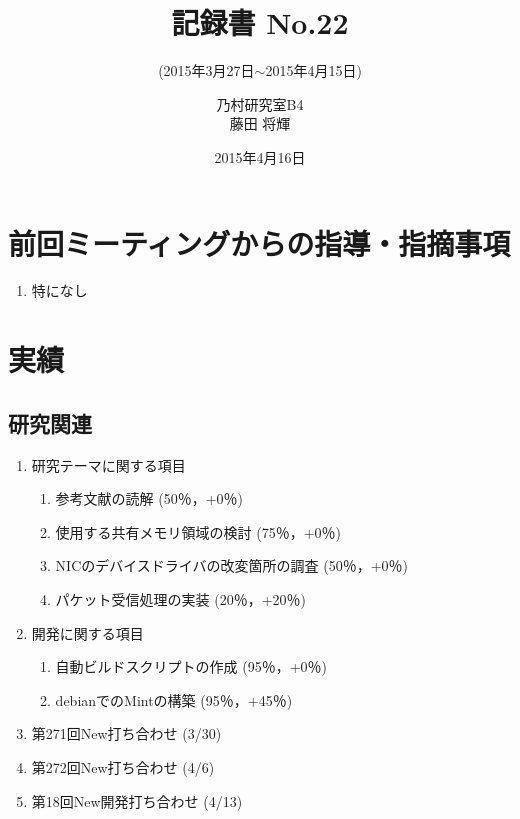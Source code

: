 \documentclass[fleqn, 14pt]{extarticle}
\subtitle{(2015年3月27日$\sim$2015年4月15日)}
\author{乃村研究室B4\\藤田 将輝}
\date{2015年4月16日}
\title{記録書 No.22}
\begin{document}
\maketitle
\section{前回ミーティングからの指導・指摘事項}
\label{sec-1}
\begin{enumerate}
\item 特になし
\newline
\hfill

\end{enumerate}




\section{実績}
\label{sec-2}

\subsection{研究関連}
\label{sec-2-1}
\begin{enumerate}
    \item 研究テーマに関する項目
    \hfill
    \label{enum-research1}
    \begin{enumerate}

        \item 参考文献の読解
        \hfill
        \label{enum-1-A}
        (50％，+0％)
        \item 使用する共有メモリ領域の検討
        \hfill
        \label{enum-1-B}
        (75％，+0％)
        \item NICのデバイスドライバの改変箇所の調査
        \hfill
        \label{enum-1-C}
        (50％，+0％)
        \item パケット受信処理の実装
        \hfill
        \label{enum-1-C}
        (20％，+20％)

    \end{enumerate}
    \item 開発に関する項目
    \hfill
    \label{enum-research2}
    \begin{enumerate}

        \item 自動ビルドスクリプトの作成
        \hfill
        \label{enum-2-A}
        (95％，+0％)
        \item debianでのMintの構築
        \hfill
        \label{enum-2-A}
        (95％，+45％)
    \end{enumerate}
    \item 第271回New打ち合わせ 
    \hfill
    \label{enum-research3}
    (3/30)
    \item 第272回New打ち合わせ 
    \hfill
    \label{enum-research3}
    (4/6)
    \item 第18回New開発打ち合わせ
    \hfill
    \label{enum-research3}
    (4/13)
    \end{enumerate}
\end{document}
